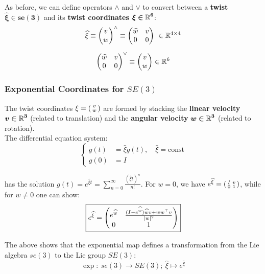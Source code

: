 As before, we can define operators $\wedge$ and $\vee$ to convert between
a \textbf{twist $\bm{\widehat{\xi} \in se(3)}$} and its
\textbf{twist coordinates} $\bm{ \xi \in \mathbb{R}^6 }$:
	\[\widehat{\xi} \equiv \begin{pmatrix} v \\ w \end{pmatrix}^{\wedge}
		\equiv \begin{pmatrix}
			\widehat{w} & v \\
			0 & 0
		\end{pmatrix}\ \in \mathbb{R}^{4 \times{} 4}\]

	\[\begin{pmatrix}
		\widehat{w} & v \\
		0 & 0
	\end{pmatrix}^{\vee} \equiv \begin{pmatrix} v \\ w \end{pmatrix} \in \mathbb{R}^6\]


\subsubsection{Exponential Coordinates for $SE(3)$}%
\label{ssub:exponential_coordinates_for_se_3_}

The twist coordinates $\xi = \left(\begin{smallmatrix} v\\w \end{smallmatrix} \right)$ are formed by stacking the
\textbf{linear velocity} $\bm{v \in \mathbb{R}^3}$ (related to translation) and the
\textbf{angular velocity} $\bm{w \in \mathbb{R}^3}$ (related to rotation).\\

The differential equation system:
	\[\left\{ \begin{aligned}
		\dot{g}(t) &= \widehat{\xi}g(t), \quad \widehat{\xi} = \text{const}\\
		g(0) &= I
	\end{aligned} \right.\]

has the solution $g(t) = e^{\widehat{\xi}t} = \sum_{n=0}^{\infty}
\frac{{(\widehat{\xi}t)}^n}{n!}$.
For $w = 0$, we have $e^{\widehat{\xi}} = \left(\begin{smallmatrix} I & v \\ 0 & 1 \end{smallmatrix} \right)$,
while for $w \ne 0$ one can show:
	\[\boxed{e^{\widehat{\xi}} = \begin{pmatrix}
		e^{\widehat{w}} & \frac{(I-e^{\widehat{w}})\widehat{w}v + ww^{\top}v}{|w|^2}\\
		0 & 1
	\end{pmatrix}}\]

The above shows that the exponential map defines a transformation from
the Lie algebra $se(3)$ to the Lie group $SE(3)$:
	\[ \exp:\ se(3) \rightarrow SE(3);\ \widehat{\xi} \mapsto e^{\widehat{\xi}}\]

